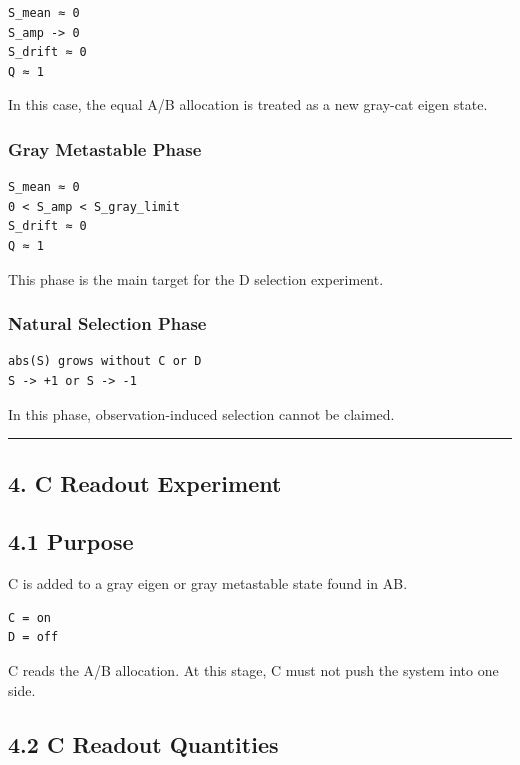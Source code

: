 \documentclass{article}
\begin{document}
\begin{verbatim}
S_mean ≈ 0
S_amp -> 0
S_drift ≈ 0
Q ≈ 1
\end{verbatim}

In this case, the equal A/B allocation is treated as a new gray-cat
eigen state.

\subsubsection{Gray Metastable Phase}\label{gray-metastable-phase}

\begin{verbatim}
S_mean ≈ 0
0 < S_amp < S_gray_limit
S_drift ≈ 0
Q ≈ 1
\end{verbatim}

This phase is the main target for the D selection experiment.

\subsubsection{Natural Selection Phase}\label{natural-selection-phase}

\begin{verbatim}
abs(S) grows without C or D
S -> +1 or S -> -1
\end{verbatim}

In this phase, observation-induced selection cannot be claimed.

\begin{center}\rule{0.5\linewidth}{0.5pt}\end{center}

\subsection{4. C Readout Experiment}\label{c-readout-experiment}

\subsection{4.1 Purpose}\label{purpose-2}

C is added to a gray eigen or gray metastable state found in AB.

\begin{verbatim}
C = on
D = off
\end{verbatim}

C reads the A/B allocation. At this stage, C must not push the system
into one side.

\subsection{4.2 C Readout Quantities}\label{c-readout-quantities}
\end{document}
